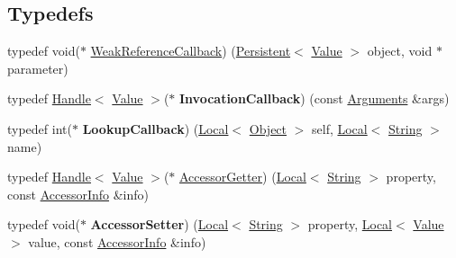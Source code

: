 \subsection*{Typedefs}
\begin{DoxyCompactItemize}
\item 
typedef void($\ast$ \hyperlink{namespacev8_a4d5db775dbc002b23f1b55ec7ce80ea5}{Weak\+Reference\+Callback}) (\hyperlink{classv8_1_1_persistent}{Persistent}$<$ \hyperlink{classv8_1_1_value}{Value} $>$ object, void $\ast$parameter)
\item 
\hypertarget{namespacev8_aa1cc8187a527d2cd85d6e4908c0a0513}{}typedef \hyperlink{classv8_1_1_handle}{Handle}$<$ \hyperlink{classv8_1_1_value}{Value} $>$($\ast$ {\bfseries Invocation\+Callback}) (const \hyperlink{classv8_1_1_arguments}{Arguments} \&args)\label{namespacev8_aa1cc8187a527d2cd85d6e4908c0a0513}

\item 
\hypertarget{namespacev8_a6d324b3dfb39ae108a93f455cb02a38f}{}typedef int($\ast$ {\bfseries Lookup\+Callback}) (\hyperlink{classv8_1_1_local}{Local}$<$ \hyperlink{classv8_1_1_object}{Object} $>$ self, \hyperlink{classv8_1_1_local}{Local}$<$ \hyperlink{classv8_1_1_string}{String} $>$ name)\label{namespacev8_a6d324b3dfb39ae108a93f455cb02a38f}

\item 
typedef \hyperlink{classv8_1_1_handle}{Handle}$<$ \hyperlink{classv8_1_1_value}{Value} $>$($\ast$ \hyperlink{namespacev8_a3016fe071826349d1370a700e71be094}{Accessor\+Getter}) (\hyperlink{classv8_1_1_local}{Local}$<$ \hyperlink{classv8_1_1_string}{String} $>$ property, const \hyperlink{classv8_1_1_accessor_info}{Accessor\+Info} \&info)
\item 
\hypertarget{namespacev8_a6bf0ccffe563bf71d01828b3512705ed}{}typedef void($\ast$ {\bfseries Accessor\+Setter}) (\hyperlink{classv8_1_1_local}{Local}$<$ \hyperlink{classv8_1_1_string}{String} $>$ property, \hyperlink{classv8_1_1_local}{Local}$<$ \hyperlink{classv8_1_1_value}{Value} $>$ value, const \hyperlink{classv8_1_1_accessor_info}{Accessor\+Info} \&info)\label{namespacev8_a6bf0ccffe563bf71d01828b3512705ed}


\end{DoxyCompactItemize}
